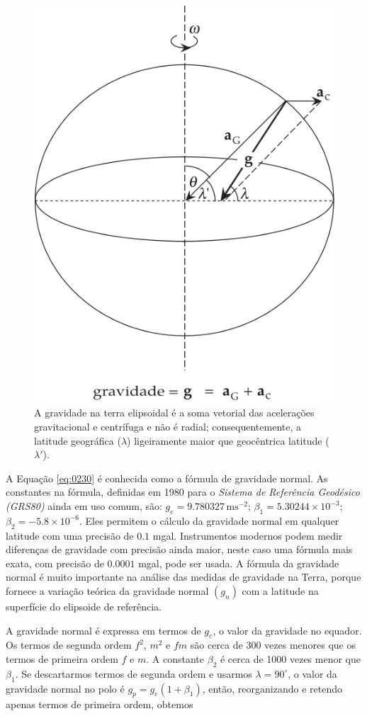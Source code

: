 \documentclass[]{book}
\theoremstyle{definition}
\theoremstyle{definition}
\theoremstyle{definition}
\theoremstyle{remark}
\begin{document}
\begin{figure}

{\centering \includegraphics[width=0.4\linewidth]{fig/Fig_02.24} 

}

\caption{A gravidade na terra elipsoidal é a soma vetorial das acelerações gravitacional e centrífuga e não é radial; consequentemente, a latitude geográfica ($\lambda$) ligeiramente maior que geocêntrica latitude ($\lambda'$). }\label{fig:elipsoide4}
\end{figure}

A Equação \eqref{eq:0230} é conhecida como a fórmula de gravidade normal. As constantes na fórmula, definidas em 1980 para o \emph{Sistema de Referência Geodésico (GRS80)} ainda em uso comum, são: \(g_e= 9.780327\, \text{m}\text{s}^{-2}\); \(\beta_1=5.30244\times 10^{-3}\); \(\beta_2 = -5.8\times 10^{-6}\). Eles permitem o cálculo da gravidade normal em qualquer latitude com uma precisão de \(0.1\) mgal. Instrumentos modernos podem medir diferenças de gravidade com precisão ainda maior, neste caso uma fórmula mais exata, com precisão de \(0.0001\) mgal, pode ser usada. A fórmula da gravidade normal é muito importante na análise das medidas de gravidade na Terra, porque fornece a variação teórica da gravidade normal \((g_n)\) com a latitude na superfície do elipsoide de referência.

A gravidade normal é expressa em termos de \(g_e\), o valor da gravidade no equador. Os termos de segunda ordem \(f^2\), \(m^2\) e \(fm\) são cerca de 300 vezes menores que os termos de primeira ordem \(f\) e \(m\). A constante \(\beta_2\) é cerca de 1000 vezes menor que \(\beta_1\). Se descartarmos termos de segunda ordem e usarmos \(\lambda = 90^\circ\), o valor da gravidade normal no polo é \(g_p= g_e (1+\beta_1)\), então, reorganizando e retendo apenas termos de primeira ordem, obtemos
\end{document}
